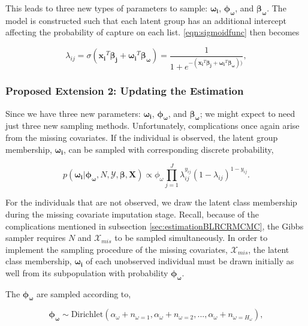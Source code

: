 \documentclass[
  12pt,
]{article}
\begin{document}
This leads to three new types of parameters to sample:
\(\boldsymbol{\omega_i}\), \(\boldsymbol{\phi_\omega}\), and
\(\boldsymbol{\beta_\omega}\). The model is constructed such that each
latent group has an additional intercept affecting the probability of
capture on each list. \autoref{eqn:sigmoidfunc} then becomes

\begin{equation}
\label{eqn:sigmoidfunclatentvariable}
\lambda_{ij}=\sigma(\boldsymbol{x_i}^T\boldsymbol{\beta_j} + \boldsymbol{\omega_i}^T\boldsymbol{\beta_\omega}) = \frac{1}{1+e^{-(\boldsymbol{x_i}^T\boldsymbol{\beta_j}+\boldsymbol{\omega_i}^T\boldsymbol{\beta_\omega}))}},
\end{equation}

\subsubsection{Proposed Extension 2: Updating the Estimation}

Since we have three new parameters: \(\boldsymbol{\omega_i}\),
\(\boldsymbol{\phi_\omega}\), and \(\boldsymbol{\beta_\omega}\); we
might expect to need just three new sampling methods. Unfortunately,
complications once again arise from the missing covariates. If the
individual is observed, the latent group membership,
\(\boldsymbol{\omega_i}\), can be sampled with corresponding discrete
probability,

\begin{equation}
\label{eqn:latentvariableomega}
p(\boldsymbol{\omega_i}|\boldsymbol{\phi_\omega},N,\mathcal{Y},\boldsymbol{\beta},\boldsymbol{X}) \propto \phi_\omega\prod_{j=1}^J\lambda_{ij}^{y_{ij}}(1-\lambda_{ij})^{1-y_{ij}}.
\end{equation}

For the individuals that are not observed, we draw the latent class
membership during the missing covariate imputation stage. Recall,
because of the complications mentioned in subsection
\ref{sec:estimationBLRCRMCMC}, the Gibbs sampler requires \(N\) and
\(\mathcal{X}_{mis}\) to be sampled simultaneously. In order to
implement the sampling procedure of the missing covariates,
\(\mathcal{X}_{mis}\), the latent class membership,
\(\boldsymbol{\omega_i}\) of each unobserved individual must be drawn
initially as well from its subpopulation with probability
\(\boldsymbol{\phi_\omega}\).

The \(\boldsymbol{\phi_\omega}\) are sampled according to,

\begin{equation}
\label{eqn:latentvariablePHIomega}
\boldsymbol{\phi_\omega} \sim \text{Dirichlet}(\alpha_\omega + n_{\omega=1}, \alpha_\omega+n_{\omega=2}, ..., \alpha_\omega+n_{\omega={H_\omega}}),
\end{equation}
\end{document}
